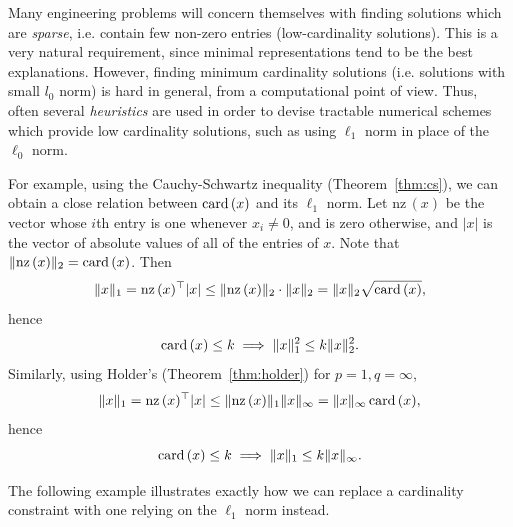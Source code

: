 \documentclass[11 pt]{scrartcl}
\newcommand{\nz}{\text{nz}\,}
\begin{document}
Many engineering problems will concern themselves with finding solutions which are \emph{sparse}, i.e. contain few non-zero entries (low-cardinality solutions). 
This is a very natural requirement, since minimal representations tend to be the best explanations. 
However, finding minimum cardinality solutions (i.e. solutions with small $l_0$ norm) is hard in general, from a computational point of view. 
Thus, often several \emph{heuristics} are used in order to devise tractable numerical schemes which provide low cardinality solutions, such as using $\ell_1$ norm in place of the $\ell_0$ norm. 

For example, using the Cauchy-Schwartz inequality (Theorem~\ref{thm:cs}), we can obtain a close relation between $\text{card}\,(x)$ and its $\ell_1$ norm. 
Let $\nz(x)$ be the vector whose $i$th entry is one whenever $x_i\not= 0$, and is zero otherwise, and $|x|$ is the vector of absolute values of all of the entries of $x$.
Note that $\|\nz(x)\|_2 = \card(x)$.
Then 
\[ \|x\|_1 = \nz(x)^\T |x| \leq \|\nz(x)\|_2 \cdot \|x\|_2 = \|x\|_2 \sqrt{\card(x)},\]
hence 
\[ \text{card}\,(x) \leq k \implies \|x\|_1^2 \leq k \|x\|_2^2.\] 
Similarly, using Holder's (Theorem~\ref{thm:holder}) for $p = 1, q=\infty$, 
\[ \|x\|_1 = \nz(x)^\T |x| \leq \|\nz(x)\|_1 \|x\|_\infty = \|x\|_\infty\, \card(x),\] 
hence 
\[ \text{card}\,(x) \leq k \implies \|x\|_1 \leq k\|x\|_\infty.\] 

The following example illustrates exactly how we can replace a cardinality constraint with one relying on the $\ell_1$ norm instead. 
\end{document}
